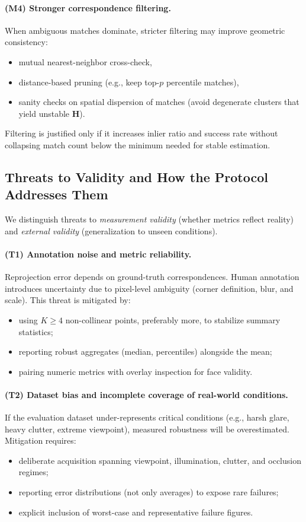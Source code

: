 \paragraph{(M4) Stronger correspondence filtering.}
When ambiguous matches dominate, stricter filtering may improve geometric consistency:
\begin{itemize}
  \item mutual nearest-neighbor cross-check,
  \item distance-based pruning (e.g., keep top-$p$ percentile matches),
  \item sanity checks on spatial dispersion of matches (avoid degenerate clusters that yield unstable $\mathbf{H}$).
\end{itemize}
Filtering is justified only if it increases inlier ratio and success rate without collapsing match count below the minimum needed for stable estimation.

\subsection{Threats to Validity and How the Protocol Addresses Them}
\label{subsec:threats}
We distinguish threats to \emph{measurement validity} (whether metrics reflect reality) and \emph{external validity} (generalization to unseen conditions).

\paragraph{(T1) Annotation noise and metric reliability.}
Reprojection error depends on ground-truth correspondences. Human annotation introduces uncertainty due to pixel-level ambiguity (corner definition, blur, and scale). This threat is mitigated by:
\begin{itemize}
  \item using $K\ge 4$ non-collinear points, preferably more, to stabilize summary statistics;
  \item reporting robust aggregates (median, percentiles) alongside the mean;
  \item pairing numeric metrics with overlay inspection for face validity.
\end{itemize}

\paragraph{(T2) Dataset bias and incomplete coverage of real-world conditions.}
If the evaluation dataset under-represents critical conditions (e.g., harsh glare, heavy clutter, extreme viewpoint), measured robustness will be overestimated. Mitigation requires:
\begin{itemize}
  \item deliberate acquisition spanning viewpoint, illumination, clutter, and occlusion regimes;
  \item reporting error distributions (not only averages) to expose rare failures;
  \item explicit inclusion of worst-case and representative failure figures.
\end{itemize}

